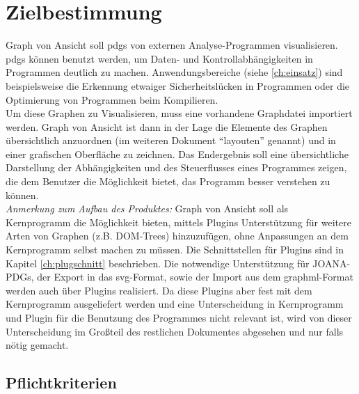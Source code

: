 \chapter{Zielbestimmung}
Graph von Ansicht soll \glspl{pdg} von externen Analyse-Programmen visualisieren.
\glspl{pdg} können benutzt werden, um Daten- und Kontrollabhängigkeiten in Programmen deutlich zu machen.
Anwendungsbereiche (siehe \ref{ch:einsatz}) sind beispielsweise die Erkennung etwaiger Sicherheitslücken\cite{hammer09ijis} in Programmen
oder die Optimierung von Programmen beim Kompilieren\cite{Ferrante:1987:PDG:24039.24041}.\\
Um diese Graphen zu Visualisieren, muss eine vorhandene Graphdatei importiert werden.
Graph von Ansicht ist dann in der Lage die Elemente des Graphen übersichtlich anzuordnen (im weiteren Dokument ``layouten'' genannt) und in einer grafischen Oberfläche zu zeichnen.
Das Endergebnis soll eine übersichtliche Darstellung der Abhängigkeiten und des Steuerflusses eines Programmes zeigen, die dem Benutzer die Möglichkeit bietet, das Programm besser verstehen zu können.\\

\textit{Anmerkung zum Aufbau des Produktes:} Graph von Ansicht soll als Kernprogramm die Möglichkeit bieten,
mittels Plugins Unterstützung für weitere Arten von Graphen (z.B. DOM-Trees)
hinzuzufügen, ohne Anpassungen an dem Kernprogramm selbst machen zu müssen.
Die Schnittstellen für Plugins sind in Kapitel \ref{ch:plugschnitt} beschrieben.
Die notwendige Unterstützung für JOANA-PDGs, der Export in das \gls{svg}-Format, sowie der Import aus dem \gls{graphml}-Format werden auch über Plugins realisiert.
Da diese Plugins aber fest mit dem Kernprogramm ausgeliefert werden und eine Unterscheidung in Kernprogramm und Plugin für die Benutzung des
Programmes nicht relevant ist, wird von dieser Unterscheidung im Großteil des restlichen Dokumentes abgesehen und nur falls nötig gemacht.

\section{Pflichtkriterien}

